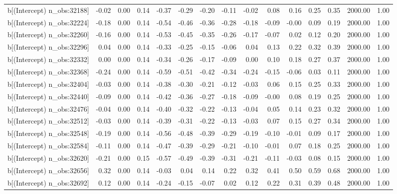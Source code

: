 \begin{table}[ht]
\begin{tabular}{rrrrrrrrrrrrrrr}
  b[(Intercept) n\_obs:32188] & -0.02 & 0.00 & 0.14 & -0.37 & -0.29 & -0.20 & -0.11 & -0.02 & 0.08 & 0.16 & 0.25 & 0.35 & 2000.00 & 1.00 \\ 
  b[(Intercept) n\_obs:32224] & -0.18 & 0.00 & 0.14 & -0.54 & -0.46 & -0.36 & -0.28 & -0.18 & -0.09 & -0.00 & 0.09 & 0.19 & 2000.00 & 1.00 \\ 
  b[(Intercept) n\_obs:32260] & -0.16 & 0.00 & 0.14 & -0.53 & -0.45 & -0.35 & -0.26 & -0.17 & -0.07 & 0.02 & 0.12 & 0.20 & 2000.00 & 1.00 \\ 
  b[(Intercept) n\_obs:32296] & 0.04 & 0.00 & 0.14 & -0.33 & -0.25 & -0.15 & -0.06 & 0.04 & 0.13 & 0.22 & 0.32 & 0.39 & 2000.00 & 1.00 \\ 
  b[(Intercept) n\_obs:32332] & 0.00 & 0.00 & 0.14 & -0.34 & -0.26 & -0.17 & -0.09 & 0.00 & 0.10 & 0.18 & 0.27 & 0.37 & 2000.00 & 1.00 \\ 
  b[(Intercept) n\_obs:32368] & -0.24 & 0.00 & 0.14 & -0.59 & -0.51 & -0.42 & -0.34 & -0.24 & -0.15 & -0.06 & 0.03 & 0.11 & 2000.00 & 1.00 \\ 
  b[(Intercept) n\_obs:32404] & -0.03 & 0.00 & 0.14 & -0.38 & -0.30 & -0.21 & -0.12 & -0.03 & 0.06 & 0.15 & 0.25 & 0.33 & 2000.00 & 1.00 \\ 
  b[(Intercept) n\_obs:32440] & -0.09 & 0.00 & 0.14 & -0.42 & -0.36 & -0.27 & -0.18 & -0.09 & -0.00 & 0.08 & 0.19 & 0.25 & 2000.00 & 1.00 \\ 
  b[(Intercept) n\_obs:32476] & -0.04 & 0.00 & 0.14 & -0.40 & -0.32 & -0.22 & -0.13 & -0.04 & 0.05 & 0.14 & 0.23 & 0.32 & 2000.00 & 1.00 \\ 
  b[(Intercept) n\_obs:32512] & -0.03 & 0.00 & 0.14 & -0.39 & -0.31 & -0.22 & -0.13 & -0.03 & 0.07 & 0.15 & 0.27 & 0.34 & 2000.00 & 1.00 \\ 
  b[(Intercept) n\_obs:32548] & -0.19 & 0.00 & 0.14 & -0.56 & -0.48 & -0.39 & -0.29 & -0.19 & -0.10 & -0.01 & 0.09 & 0.17 & 2000.00 & 1.00 \\ 
  b[(Intercept) n\_obs:32584] & -0.11 & 0.00 & 0.14 & -0.47 & -0.39 & -0.29 & -0.21 & -0.10 & -0.01 & 0.07 & 0.18 & 0.25 & 2000.00 & 1.00 \\ 
  b[(Intercept) n\_obs:32620] & -0.21 & 0.00 & 0.15 & -0.57 & -0.49 & -0.39 & -0.31 & -0.21 & -0.11 & -0.03 & 0.08 & 0.15 & 2000.00 & 1.00 \\ 
  b[(Intercept) n\_obs:32656] & 0.32 & 0.00 & 0.14 & -0.03 & 0.04 & 0.14 & 0.22 & 0.32 & 0.41 & 0.50 & 0.59 & 0.68 & 2000.00 & 1.00 \\ 
  b[(Intercept) n\_obs:32692] & 0.12 & 0.00 & 0.14 & -0.24 & -0.15 & -0.07 & 0.02 & 0.12 & 0.22 & 0.31 & 0.39 & 0.48 & 2000.00 & 1.00 \\ 

\end{tabular}
\end{table}
